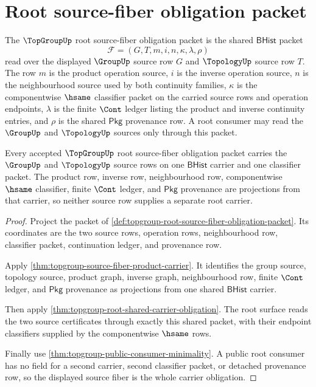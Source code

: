 \section{Root source-fiber obligation packet}
\label{sec:topgroup-root-source-fiber-obligation-packet}

\begin{definition}
\label{def:topgroup-root-source-fiber-obligation-packet}
The $\TopGroupUp$ root source-fiber obligation packet is the shared
$\mathsf{BHist}$ packet
$$
\mathcal F=(G,T,m,i,n,\kappa,\lambda,\rho)
$$
read over the displayed $\GroupUp$ source row $G$ and $\TopologyUp$ source row
$T$. The row $m$ is the product operation source, $i$ is the inverse operation
source, $n$ is the neighbourhood source used by both continuity families,
$\kappa$ is the componentwise $\hsame$ classifier packet on the carried source
rows and operation endpoints, $\lambda$ is the finite $\Cont$ ledger listing
the product and inverse continuity entries, and $\rho$ is the shared
$\mathsf{Pkg}$ provenance row. A root consumer may read the $\GroupUp$ and
$\TopologyUp$ sources only through this packet.
\end{definition}

\begin{theorem}
\label{thm:topgroup-root-source-fiber-carrier-obligation}
Every accepted $\TopGroupUp$ root source-fiber obligation packet carries the
$\GroupUp$ and $\TopologyUp$ source rows on one $\mathsf{BHist}$ carrier and
one classifier packet. The product row, inverse row, neighbourhood row,
componentwise $\hsame$ classifier, finite $\Cont$ ledger, and $\mathsf{Pkg}$
provenance are projections from that carrier, so neither source row supplies a
separate root carrier.
\end{theorem}
\begin{proof}
Project the packet of
\autoref{def:topgroup-root-source-fiber-obligation-packet}. Its coordinates
are the two source rows, operation rows, neighbourhood row, classifier packet,
continuation ledger, and provenance row.

Apply \autoref{thm:topgroup-source-fiber-product-carrier}. It identifies the
group source, topology source, product graph, inverse graph, neighbourhood
row, finite $\Cont$ ledger, and $\mathsf{Pkg}$ provenance as projections from
one shared $\mathsf{BHist}$ carrier.

Then apply \autoref{thm:topgroup-root-shared-carrier-obligation}. The root
surface reads the two source certificates through exactly this shared packet,
with their endpoint classifiers supplied by the componentwise $\hsame$ rows.

Finally use \autoref{thm:topgroup-public-consumer-minimality}. A public root
consumer has no field for a second carrier, second classifier packet, or
detached provenance row, so the displayed source fiber is the whole carrier
obligation.
\end{proof}

